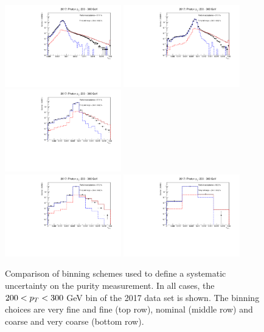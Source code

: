 \begin{figure}[htbp]
    \centering
        \includegraphics[width=0.45\textwidth]{PhotonPurity/fit_2017_pt200-300_vfine.pdf}
        \includegraphics[width=0.45\textwidth]{PhotonPurity/fit_2017_pt200-300_fine.pdf} \\
        \includegraphics[width=0.45\textwidth]{PhotonPurity/fit_2017_pt200-300_nominal.pdf} \\
        \includegraphics[width=0.45\textwidth]{PhotonPurity/fit_2017_pt200-300_coarse.pdf}
        \includegraphics[width=0.45\textwidth]{PhotonPurity/fit_2017_pt200-300_vcoarse.pdf}
    \caption{Comparison of binning schemes used to define a systematic uncertainty on the purity measurement. In all cases, the 
    $200<p_T<300$ GeV bin of the 2017 data set is shown. The binning choices are very fine and fine (top row), nominal (middle row) 
    and coarse and very coarse (bottom row).}
    \label{fig:purity_binning}
\end{figure}
